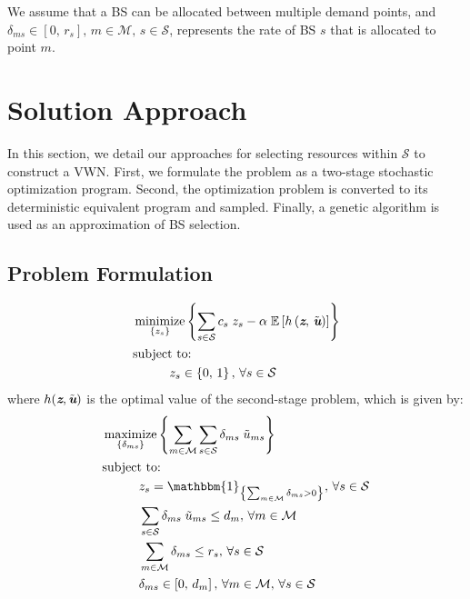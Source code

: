 \documentclass[conference]{IEEEtran}
\newcommand{\ind}[1]{\mathbbm{1}_{\left\{ #1 \right\}}}
\DeclareMathOperator*{\argmin}{minimize}
\DeclareMathOperator*{\argmax}{maximize}
\begin{document}
We assume that a BS can be allocated between multiple demand points, and $\delta_{ms} \in \left[ 0,\, r_s \right],\, m \in \mathcal{M},\, s \in \mathcal{S}$, represents the rate of BS $s$ that is allocated to point $m$.

\section{Solution Approach} \label{sec:approach}

In this section, we detail our approaches for selecting resources within $\mathcal{S}$ to construct a VWN.  First, we formulate the problem as a two-stage stochastic optimization program.  Second, the optimization problem is converted to its deterministic equivalent program and sampled.  Finally, a genetic algorithm is used as an approximation of BS selection.

\subsection{Problem Formulation} \label{subsec:stoch}

\begin{tcolorbox}[floatplacement = !ht, float, title = Problem 1:\\Two-Stage Stochastic Optimization Program]
\begin{align}
& \argmin_{\left\{ z_s \right\}} \left\{ \sum_{s \in \mathcal{S}} c_s \; z_s - \alpha \; \mathbb{E}\left[ h\left( \textit{\textbf{z}},\, \tilde{\textit{\textbf{u}}} \right) \right] \right\} \label{eq:SOPS1O} \\
& \text{subject to:}  \nonumber \\
& \hspace{0.4in} z_s \in \left\{ 0,\, 1 \right\},\, \forall s \in \mathcal{S} \label{eq:SOPS1C1}
\end{align}
where $h(\textit{\textbf{z}}, \tilde{\textit{\textbf{u}}})$ is the optimal value of the second-stage problem, which is given by:
\begin{align}
& \argmax_{\left\{ \delta_{ms} \right\}} \left\{ \sum_{m \in \mathcal{M}} \sum_{s \in \mathcal{S}} \delta_{ms} \; \tilde{u}_{ms} \right\} \label{eq:SOPS2O} \\
& \text{subject to:}  \nonumber \\
& \hspace{0.4in} z_s = \ind{\sum_{m \in \mathcal{M}} \delta_{ms} > 0},\, \forall s \in \mathcal{S} \label{eq:SOPS2C1} \\
& \hspace{0.4in} \sum_{s \in \mathcal{S}} \delta_{ms} \; \tilde{u}_{ms} \leq d_m,\, \forall m \in \mathcal{M} \label{eq:SOPS2C2} \\
& \hspace{0.4in} \sum_{m \in \mathcal{M}} \delta_{ms} \leq r_s,\, \forall s \in \mathcal{S} \label{eq:SOPS2C3} \\
& \hspace{0.4in} \delta_{ms} \in \left[ 0,\, d_m \right],\, \forall m \in \mathcal{M},\, \forall s \in \mathcal{S} \label{eq:SOPS2C4}
\end{align}
\end{tcolorbox}
\end{document}

